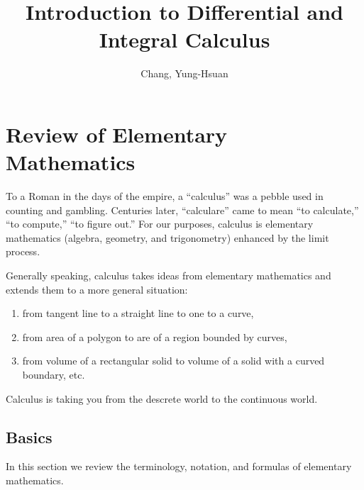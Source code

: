\documentclass[11pt]{book}
\title{\textbf{Introduction to Differential and Integral Calculus}}
\author{Chang, Yung-Hsuan}
\begin{document}
\maketitle
\thispagestyle{empty}
\newpage
{}
\newpage
{}
{}
\tableofcontents



\newpage
{}

\chapter{Review of Elementary Mathematics}

To a Roman in the days of the empire, a “calculus” was a pebble used in counting and gambling. Centuries later, “calculare” came to mean “to calculate,” “to compute,” “to figure out.” For our purposes, calculus is elementary mathematics (algebra, geometry, and trigonometry) enhanced by the limit process.

Generally speaking, calculus takes ideas from elementary mathematics and extends them to a more general situation: 
\begin{enumerate}
    \item from tangent line to a straight line to one to a curve,
    \item from area of a polygon to are of a region bounded by curves,
    \item from volume of a rectangular solid to volume of a solid with a curved boundary, etc.
\end{enumerate}

Calculus is taking you from the descrete world to the continuous world.

\section{Basics}

In this section we review the terminology, notation, and formulas of elementary mathematics.
\end{document}
